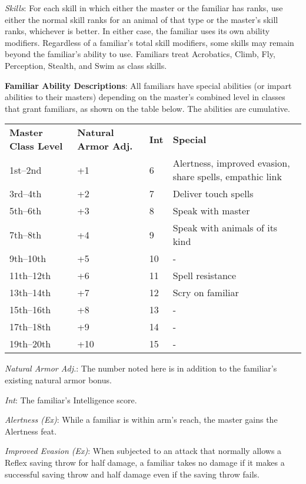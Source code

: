 \textit{Skills}: For each skill in which either the master or the familiar has ranks, use either the normal skill ranks for an animal of that type or the master's skill ranks, whichever is better. In either case, the familiar uses its own ability modifiers. Regardless of a familiar's total skill modifiers, some skills may remain beyond the familiar's ability to use. Familiars treat Acrobatics, Climb, Fly, Perception, Stealth, and Swim as class skills.
				
\textbf{Familiar Ability Descriptions}: All familiars have special abilities (or impart abilities to their masters) depending on the master's combined level in classes that grant familiars, as shown on the table below. The abilities are cumulative. 

\begin{table}
 \sffamily
 \begin{tabular}{llll}
\textbf{Master Class Level} & \textbf{Natural Armor Adj.} & \textbf{Int} & \textbf{Special} \\
1st--2nd & +1 & 6 & Alertness, improved evasion, share spells, empathic link \\
3rd--4th & +2 & 7 & Deliver touch spells\\
5th--6th & +3 & 8 & Speak with master\\
7th--8th & +4 & 9 & Speak with animals of its kind\\
9th--10th & +5 & 10 & - \\
11th--12th & +6 & 11 & Spell resistance \\
13th--14th & +7 & 12 & Scry on familiar\\
15th--16th & +8 & 13 & - \\
17th--18th & +9 & 14 & -\\
19th--20th & +10 & 15 & -\\  
 \end{tabular}

\end{table}
			
\textit{Natural Armor Adj.}: The number noted here is in addition to the familiar's existing natural armor bonus.
				
\textit{Int}: The familiar's Intelligence score.
				
\textit{Alertness (Ex)}: While a familiar is within arm's reach, the master gains the Alertness feat.
				
\textit{Improved Evasion (Ex)}: When subjected to an attack that normally allows a Reflex saving throw for half damage, a familiar takes no damage if it makes a successful saving throw and half damage even if the saving throw fails.
				
